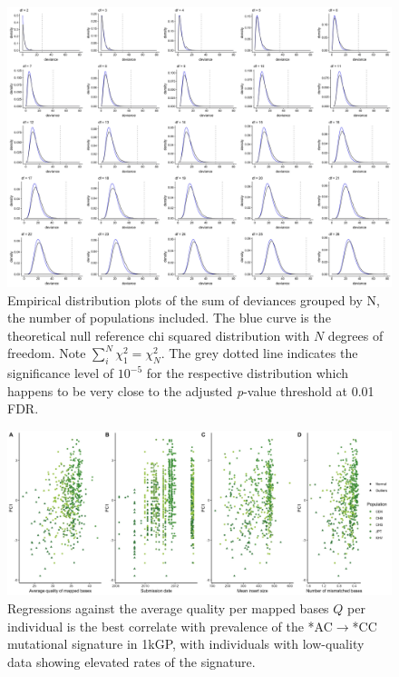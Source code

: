 \documentclass[9pt,lineno]{elife}
\begin{document}
\begin{figure}
\includegraphics[width=\hsize,keepaspectratio]{./Figures/AllDeviances.jpg}

\caption{Empirical distribution plots of the sum of deviances grouped by N, the number of populations included. The blue curve is the theoretical null reference chi squared distribution with $N$ degrees of freedom. Note $\sum_i^N  \chi^2_1= \chi^2_N$. The grey dotted line indicates the significance level of $10^{-5}$ for the respective distribution which happens to be very close to the adjusted \textit{p}-value threshold at 0.01 FDR. }
\label{Deviances}
\end{figure}

\begin{figure}
\includegraphics[width=\hsize,keepaspectratio]{./Figures/PC1_Correlation.jpg}
\caption{Regressions against the average quality per mapped bases $Q$ per individual is the best correlate with prevalence of the  *AC${\rightarrow}$*CC mutational signature in 1kGP, with individuals with low-quality data showing elevated rates of the signature.  }
\label{PC1_Correlation}
\end{figure}
\end{document}
